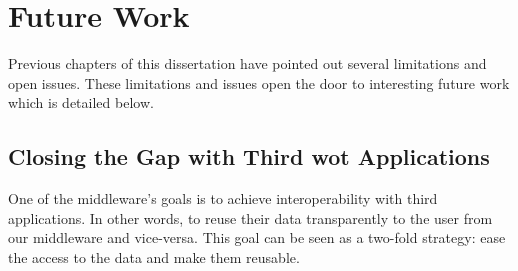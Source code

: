 \section{Future Work}


Previous chapters of this dissertation have pointed out several limitations and open issues.
These limitations and issues open the door to interesting future work which is detailed below.


\subsection{Closing the Gap with Third \acs{wot} Applications}

One of the middleware's goals is to achieve interoperability with third applications.
In other words, to reuse their data transparently to the user from our middleware and vice-versa.
This goal can be seen as a two-fold strategy: ease the access to the data and make them reusable.

